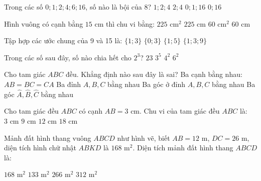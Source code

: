 \documentclass[12pt,a4paper]{article}
\begin{document}
\begin{ex}
Trong các số $0; 1; 2; 4; 6; 16$, số nào là bội của 8?
\choice
{$1; 2; 4$}
{$2; 4$}
{$0; 1; 16$}
{\True $0; 16$}
\end{ex}

\begin{ex}
Hình vuông có cạnh bằng $15\text{ cm}$ thì chu vi bằng:
\choice
{$225\text{ cm}^2$}
{$225\text{ cm}$}
{$60\text{ cm}^2$}
{\True $60\text{ cm}$}
\end{ex}

\begin{ex}
Tập hợp các ước chung của 9 và 15 là:
\choice
{\True $\{1; 3\}$}
{$\{0; 3\}$}
{$\{1; 5\}$}
{$\{1; 3; 9\}$}
\end{ex}

\begin{ex}
Trong các số sau đây, số nào chia hết cho $2^3$?
\choice
{$23$}
{$3^5$}
{\True $4^2$}
{$6^2$}
\end{ex}

\begin{ex}
Cho tam giác $ABC$ đều. Khẳng định nào sau đây là sai?
\choice
{Ba cạnh bằng nhau: $AB = BC = CA$}
{\True Ba đỉnh $A, B, C$ bằng nhau}
{Ba góc ở đỉnh $A, B, C$ bằng nhau}
{Ba góc $\widehat{A}, \widehat{B}, \widehat{C}$ bằng nhau}
\end{ex}

\begin{ex}
Cho tam giác đều $ABC$ có cạnh $AB = 3\text{ cm}$. Chu vi của tam giác đều $ABC$ là:
\choice
{$3\text{ cm}$}
{\True $9\text{ cm}$}
{$12\text{ cm}$}
{$18\text{ cm}$}
\end{ex}

\begin{ex}
Mảnh đất hình thang vuông $ABCD$ như hình vẽ, biết $AB = 12\text{ m}$, $DC = 26\text{ m}$, diện tích hình chữ nhật $ABKD$ là $168\text{ m}^2$. Diện tích mảnh đất hình thang $ABCD$ là:
\begin{center}
\end{center}
\choice
{$168\text{ m}^2$}
{$133\text{ m}^2$}
{\True $266\text{ m}^2$}
{$312\text{ m}^2$}
\end{ex}
\end{document}
